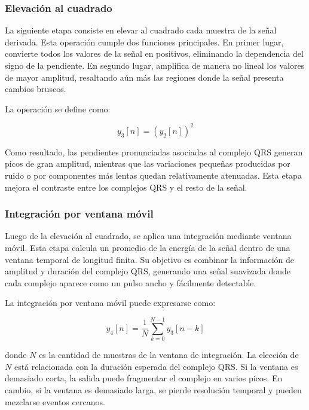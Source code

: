 \documentclass[12pt]{article}
\begin{document}
				\subsubsection{Elevación al cuadrado}

				La siguiente etapa consiste en elevar al cuadrado cada muestra de la señal derivada. Esta operación cumple dos funciones principales. En primer lugar, convierte todos los valores de la señal en positivos, eliminando la dependencia del signo de la pendiente. En segundo lugar, amplifica de manera no lineal los valores de mayor amplitud, resaltando aún más las regiones donde la señal presenta cambios bruscos.

				La operación se define como:

				\begin{equation}
					y_3[n] = \left(y_2[n]\right)^2
				\end{equation}

				Como resultado, las pendientes pronunciadas asociadas al complejo QRS generan picos de gran amplitud, mientras que las variaciones pequeñas producidas por ruido o por componentes más lentas quedan relativamente atenuadas. Esta etapa mejora el contraste entre los complejos QRS y el resto de la señal.

				\subsubsection{Integración por ventana móvil}

				Luego de la elevación al cuadrado, se aplica una integración mediante ventana móvil. Esta etapa calcula un promedio de la energía de la señal dentro de una ventana temporal de longitud finita. Su objetivo es combinar la información de amplitud y duración del complejo QRS, generando una señal suavizada donde cada complejo aparece como un pulso ancho y fácilmente detectable.

				La integración por ventana móvil puede expresarse como:

				\begin{equation}
					y_4[n] = \frac{1}{N}\sum_{k=0}^{N-1} y_3[n-k]
				\end{equation}

				donde $N$ es la cantidad de muestras de la ventana de integración. La elección de $N$ está relacionada con la duración esperada del complejo QRS. Si la ventana es demasiado corta, la salida puede fragmentar el complejo en varios picos. En cambio, si la ventana es demasiado larga, se pierde resolución temporal y pueden mezclarse eventos cercanos.
\end{document}
